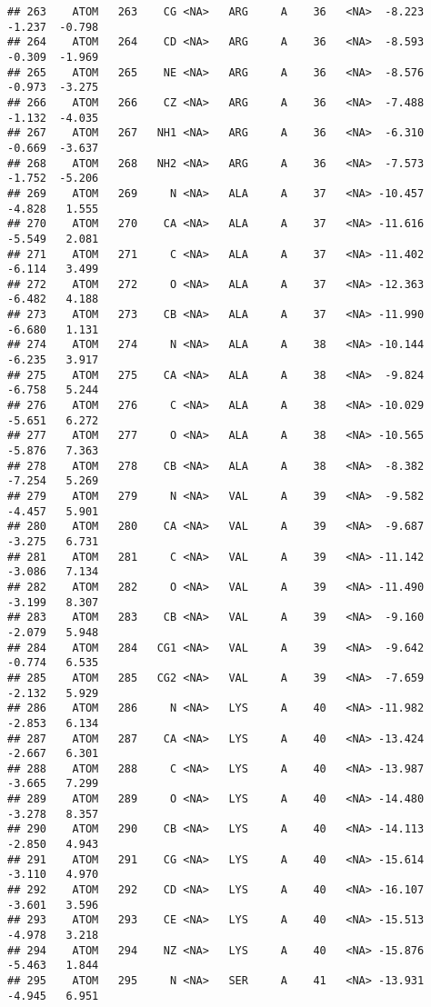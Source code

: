 \documentclass[
]{article}
\begin{document}
\begin{verbatim}
## 263    ATOM   263    CG <NA>   ARG     A    36   <NA>  -8.223  -1.237  -0.798
## 264    ATOM   264    CD <NA>   ARG     A    36   <NA>  -8.593  -0.309  -1.969
## 265    ATOM   265    NE <NA>   ARG     A    36   <NA>  -8.576  -0.973  -3.275
## 266    ATOM   266    CZ <NA>   ARG     A    36   <NA>  -7.488  -1.132  -4.035
## 267    ATOM   267   NH1 <NA>   ARG     A    36   <NA>  -6.310  -0.669  -3.637
## 268    ATOM   268   NH2 <NA>   ARG     A    36   <NA>  -7.573  -1.752  -5.206
## 269    ATOM   269     N <NA>   ALA     A    37   <NA> -10.457  -4.828   1.555
## 270    ATOM   270    CA <NA>   ALA     A    37   <NA> -11.616  -5.549   2.081
## 271    ATOM   271     C <NA>   ALA     A    37   <NA> -11.402  -6.114   3.499
## 272    ATOM   272     O <NA>   ALA     A    37   <NA> -12.363  -6.482   4.188
## 273    ATOM   273    CB <NA>   ALA     A    37   <NA> -11.990  -6.680   1.131
## 274    ATOM   274     N <NA>   ALA     A    38   <NA> -10.144  -6.235   3.917
## 275    ATOM   275    CA <NA>   ALA     A    38   <NA>  -9.824  -6.758   5.244
## 276    ATOM   276     C <NA>   ALA     A    38   <NA> -10.029  -5.651   6.272
## 277    ATOM   277     O <NA>   ALA     A    38   <NA> -10.565  -5.876   7.363
## 278    ATOM   278    CB <NA>   ALA     A    38   <NA>  -8.382  -7.254   5.269
## 279    ATOM   279     N <NA>   VAL     A    39   <NA>  -9.582  -4.457   5.901
## 280    ATOM   280    CA <NA>   VAL     A    39   <NA>  -9.687  -3.275   6.731
## 281    ATOM   281     C <NA>   VAL     A    39   <NA> -11.142  -3.086   7.134
## 282    ATOM   282     O <NA>   VAL     A    39   <NA> -11.490  -3.199   8.307
## 283    ATOM   283    CB <NA>   VAL     A    39   <NA>  -9.160  -2.079   5.948
## 284    ATOM   284   CG1 <NA>   VAL     A    39   <NA>  -9.642  -0.774   6.535
## 285    ATOM   285   CG2 <NA>   VAL     A    39   <NA>  -7.659  -2.132   5.929
## 286    ATOM   286     N <NA>   LYS     A    40   <NA> -11.982  -2.853   6.134
## 287    ATOM   287    CA <NA>   LYS     A    40   <NA> -13.424  -2.667   6.301
## 288    ATOM   288     C <NA>   LYS     A    40   <NA> -13.987  -3.665   7.299
## 289    ATOM   289     O <NA>   LYS     A    40   <NA> -14.480  -3.278   8.357
## 290    ATOM   290    CB <NA>   LYS     A    40   <NA> -14.113  -2.850   4.943
## 291    ATOM   291    CG <NA>   LYS     A    40   <NA> -15.614  -3.110   4.970
## 292    ATOM   292    CD <NA>   LYS     A    40   <NA> -16.107  -3.601   3.596
## 293    ATOM   293    CE <NA>   LYS     A    40   <NA> -15.513  -4.978   3.218
## 294    ATOM   294    NZ <NA>   LYS     A    40   <NA> -15.876  -5.463   1.844
## 295    ATOM   295     N <NA>   SER     A    41   <NA> -13.931  -4.945   6.951

\end{verbatim}
\end{document}

